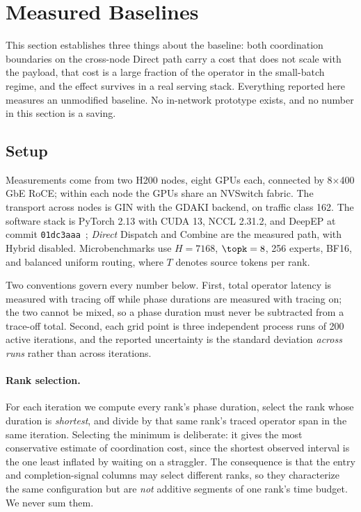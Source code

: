 \section{Measured Baselines}
\label{sec:evidence}
This section establishes three things about the baseline: both coordination boundaries
on the cross-node Direct path carry a cost that does not scale with the payload, that
cost is a large fraction of the operator in the small-batch regime, and the effect
survives in a real serving stack. Everything reported here measures an unmodified
baseline. No in-network prototype exists, and no number in this section is a saving.

\subsection{Setup}
\label{sec:setup}
Measurements come from two H200 nodes, eight GPUs each, connected by
8$\times$400\,GbE RoCE; within each node the GPUs share an NVSwitch fabric. The
transport across nodes is GIN with the GDAKI backend, on traffic class 162. The software stack is
PyTorch 2.13 with CUDA 13, NCCL 2.31.2, and DeepEP at commit
\texttt{01dc3aaa}~\cite{deepepcode}; \emph{Direct} Dispatch and Combine are the
measured path, with Hybrid disabled. Microbenchmarks use $H=7168$, $\topk=8$, 256
experts, BF16, and balanced uniform routing, where $T$ denotes source tokens per rank.

Two conventions govern every number below. First, total operator latency is measured
with tracing off while phase durations are measured with tracing on; the two cannot be
mixed, so a phase duration must never be subtracted from a trace-off total. Second,
each grid point is three independent process runs of 200 active iterations, and the
reported uncertainty is the standard deviation \emph{across runs} rather than across
iterations.

\paragraph{Rank selection.} For each iteration we compute every rank's phase duration,
select the rank whose duration is \emph{shortest}, and divide by that same rank's
traced operator span in the same iteration. Selecting the minimum is deliberate: it
gives the most conservative estimate of coordination cost, since the shortest observed
interval is the one least inflated by waiting on a straggler. The consequence is that
the entry and completion-signal columns may select different ranks, so they
characterize the same configuration but are \emph{not} additive segments of one rank's
time budget. We never sum them.

